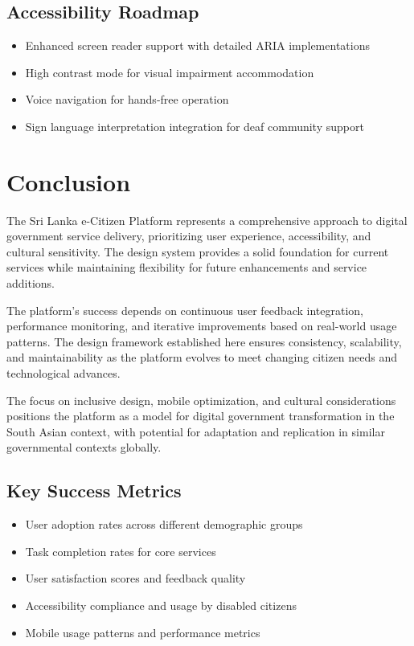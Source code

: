 \documentclass[12pt,a4paper]{article}
\begin{document}
\subsection{Accessibility Roadmap}

\begin{itemize}
    \item Enhanced screen reader support with detailed ARIA implementations
    \item High contrast mode for visual impairment accommodation
    \item Voice navigation for hands-free operation
    \item Sign language interpretation integration for deaf community support
\end{itemize}

\section{Conclusion}

The Sri Lanka e-Citizen Platform represents a comprehensive approach to digital government service delivery, prioritizing user experience, accessibility, and cultural sensitivity. The design system provides a solid foundation for current services while maintaining flexibility for future enhancements and service additions.

The platform's success depends on continuous user feedback integration, performance monitoring, and iterative improvements based on real-world usage patterns. The design framework established here ensures consistency, scalability, and maintainability as the platform evolves to meet changing citizen needs and technological advances.

The focus on inclusive design, mobile optimization, and cultural considerations positions the platform as a model for digital government transformation in the South Asian context, with potential for adaptation and replication in similar governmental contexts globally.

\subsection{Key Success Metrics}

\begin{itemize}
    \item User adoption rates across different demographic groups
    \item Task completion rates for core services
    \item User satisfaction scores and feedback quality
    \item Accessibility compliance and usage by disabled citizens
    \item Mobile usage patterns and performance metrics
\end{itemize}
\end{document}
